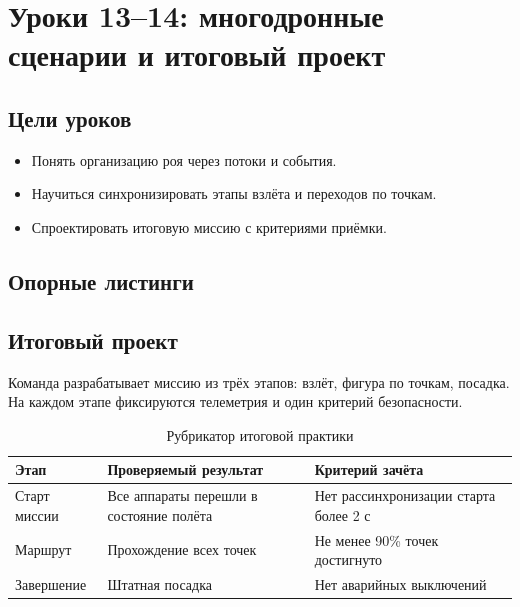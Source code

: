 \section{Уроки 13--14: многодронные сценарии и итоговый проект}

\subsection{Цели уроков}
\begin{itemize}
\item Понять организацию роя через потоки и события.
\item Научиться синхронизировать этапы взлёта и переходов по точкам.
\item Спроектировать итоговую миссию с критериями приёмки.
\end{itemize}

\subsection{Опорные листинги}




\subsection{Итоговый проект}
\begin{infobox}[ТЗ проекта]
Команда разрабатывает миссию из трёх этапов: взлёт, фигура по точкам, посадка. На каждом этапе фиксируются телеметрия и один критерий безопасности.
\end{infobox}

\begin{table}[H]
\centering
\begin{tabularx}{\textwidth}{>{\raggedright\arraybackslash}p{}>{\raggedright\arraybackslash}X>{\raggedright\arraybackslash}p{}}
\toprule
Этап & Проверяемый результат & Критерий зачёта \\
\midrule
Старт миссии & Все аппараты перешли в состояние полёта & Нет рассинхронизации старта более 2 с \\
Маршрут & Прохождение всех точек & Не менее 90\% точек достигнуто \\
Завершение & Штатная посадка & Нет аварийных выключений \\
\bottomrule
\end{tabularx}
\caption{Рубрикатор итоговой практики}
\end{table}


